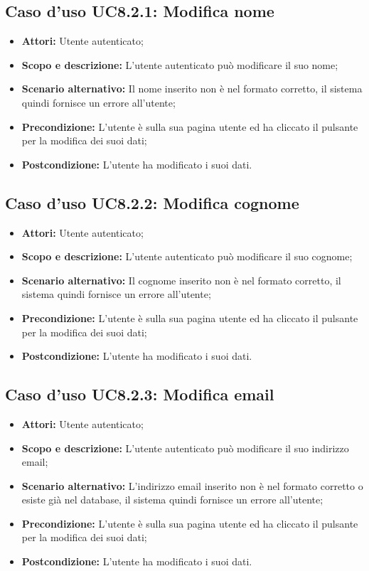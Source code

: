 \documentclass[12pt,a4paper,titlepage]{article}
\begin{document}
\subsection{Caso d'uso UC8.2.1: Modifica nome}
\begin{itemize}
	\item \textbf{Attori: }Utente autenticato;
	\item \textbf{Scopo e descrizione: }L'utente autenticato può modificare il suo nome;
	\item \textbf{Scenario alternativo: }Il nome inserito non è nel formato corretto, il sistema quindi fornisce un errore all'utente;
	\item \textbf{Precondizione: }L'utente è sulla sua pagina utente ed ha cliccato il pulsante per la modifica dei suoi dati;
	\item \textbf{Postcondizione: }L'utente ha modificato i suoi dati.
\end{itemize}
\subsection{Caso d'uso UC8.2.2: Modifica cognome}
\begin{itemize}
	\item \textbf{Attori: }Utente autenticato;
	\item \textbf{Scopo e descrizione: }L'utente autenticato può modificare il suo cognome;
	\item \textbf{Scenario alternativo: }Il cognome inserito non è nel formato corretto, il sistema quindi fornisce un errore all'utente;
	\item \textbf{Precondizione: }L'utente è sulla sua pagina utente ed ha cliccato il pulsante per la modifica dei suoi dati;
	\item \textbf{Postcondizione: }L'utente ha modificato i suoi dati.
\end{itemize}
\subsection{Caso d'uso UC8.2.3: Modifica email}
\begin{itemize}
	\item \textbf{Attori: }Utente autenticato;
	\item \textbf{Scopo e descrizione: }L'utente autenticato può modificare il suo indirizzo email;
	\item \textbf{Scenario alternativo: }L'indirizzo email inserito non è nel formato corretto o esiste già nel database, il sistema quindi fornisce un errore all'utente;
	\item \textbf{Precondizione: }L'utente è sulla sua pagina utente ed ha cliccato il pulsante per la modifica dei suoi dati;
	\item \textbf{Postcondizione: }L'utente ha modificato i suoi dati.
\end{itemize}
\end{document}
